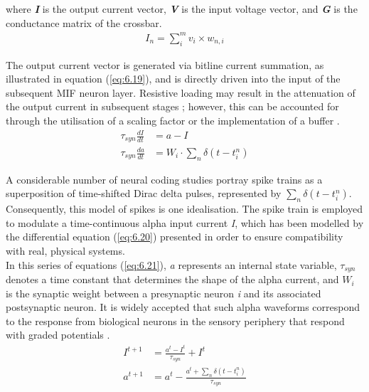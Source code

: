 \noindent where \textbf{\textit{I}} is the output current vector, \textbf{\textit{V}} is the input voltage vector, and \textbf{\textit{G}} is the conductance matrix of the crossbar.
\begin{align}
I_n = \sum_{i}^{m} v_i \times w_{n,i} \label{eq:6.19}
\end{align}

\noindent The output current vector is generated via bitline current summation, as illustrated in equation (\ref{eq:6.19}), and is directly driven into the input of the subsequent MIF neuron layer. Resistive loading may result in the attenuation of the output current in subsequent stages \cite{wang2020high}; however, this can be accounted for through the utilisation of a scaling factor or the implementation of a buffer \cite{wang2022low}.
\begin{align}
\tau_{syn} \frac{dI}{dt} &= a - I \label{eq:6.20} \\
\tau_{syn}\frac{da}{dt} &= W_i \cdot\sum_{n}\delta\left( t - t_i^n \right) \label{eq:6.21}
\end{align}

\noindent A considerable number of neural coding studies portray spike trains as a superposition of time-shifted Dirac delta pulses, represented by $\sum_{n}\delta\left( t - t_i^n \right)$. Consequently, this model of spikes is one idealisation. The spike train is employed to modulate a time-continuous alpha input current \textit{I}, which has been modelled by the differential equation (\ref{eq:6.20}) presented in order to ensure compatibility with real, physical systems. \\

\noindent In this series of equations (\ref{eq:6.21}), \textit{a} represents an internal state variable, $\tau_{syn}$ denotes a time constant that determines the shape of the alpha current, and $W_i$ is the synaptic weight between a presynaptic neuron \textit{i} and its associated postsynaptic neuron. It is widely accepted that such alpha waveforms correspond to the response from biological neurons in the sensory periphery that respond with graded potentials \cite{eshraghian2018formulation}.
\begin{align}
I^{t+1} &= \frac{a^t - I^t}{\tau_{syn}} + I^t \label{eq:6.22} \\
a^{t+1} &= a^t - \frac{a^t + \sum_{n}\delta\left( t - t_i^n \right)}{\tau_{syn}} \label{eq:6.23}
\end{align}



